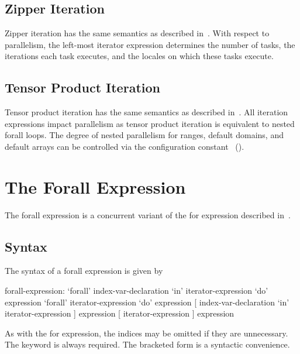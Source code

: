 \subsection{Zipper Iteration}
\label{forall_zipper}

Zipper iteration has the same semantics as described
in~.  With respect to parallelism, the
left-most iterator expression determines the number of tasks, the
iterations each task executes, and the locales on which these tasks
execute.

\subsection{Tensor Product Iteration}
\label{forall_tensor}

Tensor product iteration has the same semantics as described
in~.  All iteration expressions impact
parallelism as tensor product iteration is equivalent to nested forall
loops.  The degree of nested parallelism for ranges, default domains,
and default arrays can be controlled via the configuration
constant ~().

\section{The Forall Expression}
\label{Forall_Expressions}

The forall expression is a concurrent variant of the for expression
described in~.

\subsection{Syntax}
\label{forall_expr_syntax}

The syntax of a forall expression is given by
\begin{syntax}
forall-expression:
  `forall' index-var-declaration `in' iterator-expression `do' expression
  `forall' iterator-expression `do' expression
  [ index-var-declaration `in' iterator-expression ] expression
  [ iterator-expression ] expression
\end{syntax}
As with the for expression, the indices may be omitted if they are
unnecessary.  The  keyword is always required.  The bracketed
form is a syntactic convenience.

